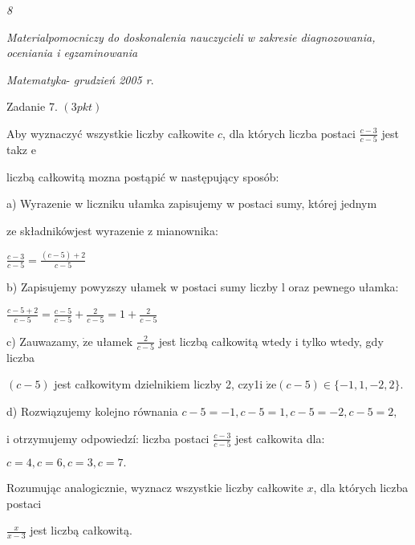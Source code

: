 \documentclass[a4paper,12pt]{article}
\begin{document}
{\it 8}

{\it Materialpomocniczy do doskonalenia nauczycieli w zakresie diagnozowania, oceniania i egzaminowania}

{\it Matematyka}- {\it grudzień 2005 r}.

Zadanie 7. $(3pkt)$

Aby wyznaczyć wszystkie liczby całkowite $c$, dla których liczba postaci $\displaystyle \frac{c-3}{c-5}$ jest takz $\mathrm{e}$

liczbą całkowitą mozna postąpić w następujący sposób:

a) Wyrazenie w liczniku ułamka zapisujemy w postaci sumy, której jednym

ze składnikówjest wyrazenie z mianownika:

$\displaystyle \frac{c-3}{c-5}=\frac{(c-5)+2}{c-5}$

b) Zapisujemy powyzszy ułamek w postaci sumy liczby l oraz pewnego ułamka:

$\displaystyle \frac{c-5+2}{c-5}=\frac{c-5}{c-5}+\frac{2}{c-5}=1+\frac{2}{c-5}$

c) Zauwazamy, $\dot{\mathrm{z}}\mathrm{e}$ ułamek $\displaystyle \frac{2}{c-5}$ jest liczbą całkowitą wtedy i tylko wtedy, gdy liczba

$(c-5)$ jest całkowitym dzielnikiem liczby 2, czy1i $\dot{\mathrm{z}}\mathrm{e}(c-5)\in\{-1,1,-2,2\}.$

d) Rozwiązujemy kolejno równania $c-5=-1, c-5=1, c-5=-2, c-5=2,$

i otrzymujemy odpowiedzí: liczba postaci $\displaystyle \frac{c-3}{c-5}$ jest całkowita dla:

$c=4,c=6,c=3,c=7.$

Rozumując analogicznie, wyznacz wszystkie liczby całkowite $x$, dla których liczba postaci

$\displaystyle \frac{x}{x-3}$ jest liczbą całkowitą.
\end{document}
